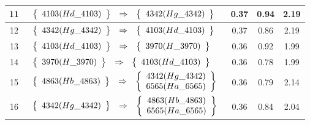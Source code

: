 \begin{longtable}{| c | l | c | c | c |}
11 & $\begin{array}{c c c}\left\{\begin{array}{c}4103 (Hd\_4103)\end{array}\right\} & \Rightarrow & \left\{\begin{array}{c}4342 (Hg\_4342)\end{array}\right\}\end{array}$ & 0.37 & 0.94 & 2.19 \\ \hline
12 & $\begin{array}{c c c}\left\{\begin{array}{c}4342 (Hg\_4342)\end{array}\right\} & \Rightarrow & \left\{\begin{array}{c}4103 (Hd\_4103)\end{array}\right\}\end{array}$ & 0.37 & 0.86 & 2.19 \\ \hline
13 & $\begin{array}{c c c}\left\{\begin{array}{c}4103 (Hd\_4103)\end{array}\right\} & \Rightarrow & \left\{\begin{array}{c}3970 (H\_3970)\end{array}\right\}\end{array}$ & 0.36 & 0.92 & 1.99 \\ \hline
14 & $\begin{array}{c c c}\left\{\begin{array}{c}3970 (H\_3970)\end{array}\right\} & \Rightarrow & \left\{\begin{array}{c}4103 (Hd\_4103)\end{array}\right\}\end{array}$ & 0.36 & 0.78 & 1.99 \\ \hline
15 & $\begin{array}{c c c}\left\{\begin{array}{c}4863 (Hb\_4863)\end{array}\right\} & \Rightarrow & \left\{\begin{array}{c}4342 (Hg\_4342) \\ 6565 (Ha\_6565)\end{array}\right\}\end{array}$ & 0.36 & 0.79 & 2.14 \\ \hline
16 & $\begin{array}{c c c}\left\{\begin{array}{c}4342 (Hg\_4342)\end{array}\right\} & \Rightarrow & \left\{\begin{array}{c}4863 (Hb\_4863) \\ 6565 (Ha\_6565)\end{array}\right\}\end{array}$ & 0.36 & 0.84 & 2.04 \\ \hline

\end{longtable}
